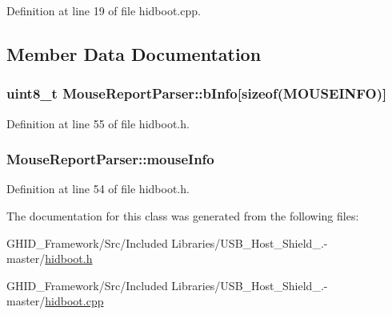 \-Definition at line 19 of file hidboot.\-cpp.



\subsection{\-Member \-Data \-Documentation}
\hypertarget{class_mouse_report_parser_aa12ee1ccfc7bf834268ab6546c11998c}{
\subsubsection[{b\-Info}]{\setlength{\rightskip}{0pt plus 5cm}uint8\-\_\-t {\bf \-Mouse\-Report\-Parser\-::b\-Info}\mbox{[}sizeof({\bf \-M\-O\-U\-S\-E\-I\-N\-F\-O})\mbox{]}}}\label{class_mouse_report_parser_aa12ee1ccfc7bf834268ab6546c11998c}


\-Definition at line 55 of file hidboot.\-h.

\hypertarget{class_mouse_report_parser_a9daf20ab8deb57500426e40827b0a79c}{
\subsubsection[{mouse\-Info}]{ {\bf \-Mouse\-Report\-Parser\-::mouse\-Info}}}\label{class_mouse_report_parser_a9daf20ab8deb57500426e40827b0a79c}


\-Definition at line 54 of file hidboot.\-h.



\-The documentation for this class was generated from the following files\-:\begin{DoxyCompactItemize}
\item 
\-G\-H\-I\-D\-\_\-\-Framework/\-Src/\-Included Libraries/\-U\-S\-B\-\_\-\-Host\-\_\-\-Shield\-\_.-\/master/\hyperlink{hidboot_8h}{hidboot.\-h}\item 
\-G\-H\-I\-D\-\_\-\-Framework/\-Src/\-Included Libraries/\-U\-S\-B\-\_\-\-Host\-\_\-\-Shield\-\_.-\/master/\hyperlink{hidboot_8cpp}{hidboot.\-cpp}\end{DoxyCompactItemize}

